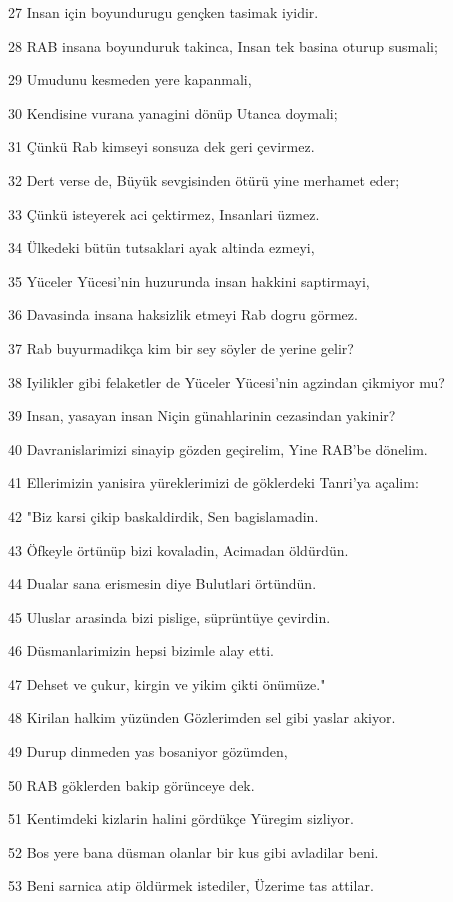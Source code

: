 \par 27 Insan için boyundurugu gençken tasimak iyidir.
\par 28 RAB insana boyunduruk takinca, Insan tek basina oturup susmali;
\par 29 Umudunu kesmeden yere kapanmali,
\par 30 Kendisine vurana yanagini dönüp Utanca doymali;
\par 31 Çünkü Rab kimseyi sonsuza dek geri çevirmez.
\par 32 Dert verse de, Büyük sevgisinden ötürü yine merhamet eder;
\par 33 Çünkü isteyerek aci çektirmez, Insanlari üzmez.
\par 34 Ülkedeki bütün tutsaklari ayak altinda ezmeyi,
\par 35 Yüceler Yücesi'nin huzurunda insan hakkini saptirmayi,
\par 36 Davasinda insana haksizlik etmeyi Rab dogru görmez.
\par 37 Rab buyurmadikça kim bir sey söyler de yerine gelir?
\par 38 Iyilikler gibi felaketler de Yüceler Yücesi'nin agzindan çikmiyor mu?
\par 39 Insan, yasayan insan Niçin günahlarinin cezasindan yakinir?
\par 40 Davranislarimizi sinayip gözden geçirelim, Yine RAB'be dönelim.
\par 41 Ellerimizin yanisira yüreklerimizi de göklerdeki Tanri'ya açalim:
\par 42 "Biz karsi çikip baskaldirdik, Sen bagislamadin.
\par 43 Öfkeyle örtünüp bizi kovaladin, Acimadan öldürdün.
\par 44 Dualar sana erismesin diye Bulutlari örtündün.
\par 45 Uluslar arasinda bizi pislige, süprüntüye çevirdin.
\par 46 Düsmanlarimizin hepsi bizimle alay etti.
\par 47 Dehset ve çukur, kirgin ve yikim çikti önümüze."
\par 48 Kirilan halkim yüzünden Gözlerimden sel gibi yaslar akiyor.
\par 49 Durup dinmeden yas bosaniyor gözümden,
\par 50 RAB göklerden bakip görünceye dek.
\par 51 Kentimdeki kizlarin halini gördükçe Yüregim sizliyor.
\par 52 Bos yere bana düsman olanlar bir kus gibi avladilar beni.
\par 53 Beni sarnica atip öldürmek istediler, Üzerime tas attilar.
